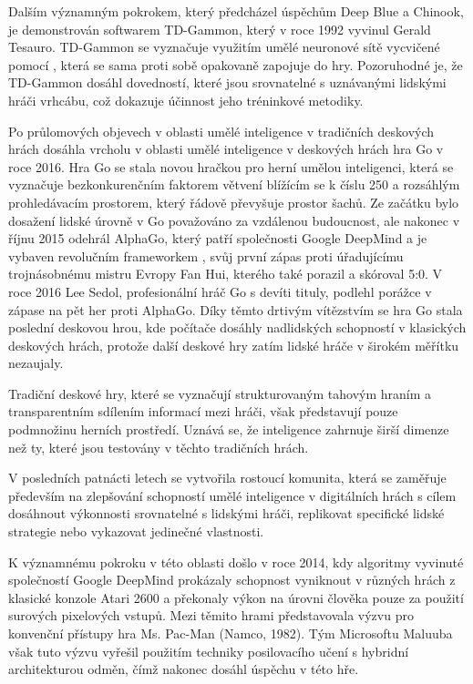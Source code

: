 Dalším významným pokrokem, který předcházel úspěchům Deep Blue a Chinook, je demonstrován softwarem TD-Gammon\cite{WikiTD}, který v roce 1992 vyvinul Gerald Tesauro. TD-Gammon se vyznačuje využitím umělé neuronové sítě vycvičené pomocí , která se sama proti sobě opakovaně zapojuje do hry. Pozoruhodné je, že TD-Gammon dosáhl dovedností, které jsou srovnatelné s uznávanými lidskými hráči vrhcábu, což dokazuje účinnost jeho tréninkové metodiky.

Po průlomových objevech v oblasti umělé inteligence v tradičních deskových hrách dosáhla vrcholu v oblasti umělé inteligence v deskových hrách hra Go v roce 2016. Hra Go se stala novou hračkou pro herní umělou inteligenci, která se vyznačuje bezkonkurenčním faktorem větvení blížícím se k číslu 250 a rozsáhlým prohledávacím prostorem, který řádově převyšuje prostor šachů. Ze začátku bylo dosažení lidské úrovně v Go považováno za vzdálenou budoucnost, ale nakonec v říjnu 2015 odehrál AlphaGo, který patří společnosti Google DeepMind a je vybaven revolučním frameworkem , svůj první zápas proti úřadujícímu trojnásobnému mistru Evropy Fan Hui, kterého také porazil a skóroval 5:0. V roce 2016 Lee Sedol, profesionální hráč Go s devíti tituly, podlehl porážce v zápase na pět her proti AlphaGo. Díky těmto drtivým vítězstvím se hra Go stala poslední deskovou hrou, kde počítače dosáhly nadlidských schopností v klasických deskových hrách, protože další deskové hry zatím lidské hráče v širokém měřítku nezaujaly\cite{AlphaGo}.

Tradiční deskové hry, které se vyznačují strukturovaným tahovým hraním a transparentním sdílením informací mezi hráči, však představují pouze podmnožinu herních prostředí. Uznává se, že inteligence zahrnuje širší dimenze než ty, které jsou testovány v těchto tradičních hrách.

V posledních patnácti letech se vytvořila rostoucí komunita, která se zaměřuje především na zlepšování schopností umělé inteligence v digitálních hrách s cílem dosáhnout výkonnosti srovnatelné s lidskými hráči, replikovat specifické lidské strategie nebo vykazovat jedinečné vlastnosti.

K významnému pokroku v této oblasti došlo v roce 2014, kdy algoritmy vyvinuté společností Google DeepMind prokázaly schopnost vyniknout v různých hrách z klasické konzole Atari 2600 a překonaly výkon na úrovni člověka pouze za použití surových pixelových vstupů. Mezi těmito hrami představovala výzvu pro konvenční přístupy hra Ms. Pac-Man (Namco, 1982). Tým Microsoftu Maluuba však tuto výzvu vyřešil použitím techniky posilovacího učení s hybridní architekturou odměn, čímž nakonec dosáhl úspěchu v této hře.

